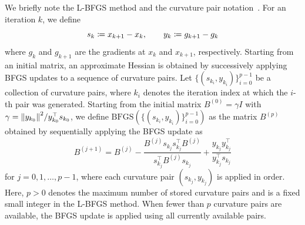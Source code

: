 \documentclass[journal]{subfiles}
\begin{document}
We briefly note the L-BFGS method and the curvature pair notation~\citep{nocedal1999numerical,liuLimitedMemoryBFGS1989a,berahasLimitedmemoryBFGSDisplacement2022}.
For an iteration $k$, we define
\begin{equation*}
    s_k \coloneqq x_{k+1}-x_k,\qquad
    y_k \coloneqq g_{k+1}-g_k
\end{equation*}
where $g_k$ and $g_{k+1}$ are the gradients at $x_k$ and $x_{k+1}$, respectively.
Starting from an initial matrix, an approximate Hessian is obtained by successively applying BFGS updates to a sequence of curvature pairs.
Let $\{(s_{k_i},y_{k_i})\}_{i=0}^{p-1}$ be a collection of curvature pairs, where $k_i$ denotes the iteration index at which the $i$-th pair was generated.
Starting from the initial matrix $B^{(0)} = \gamma I$ with $\gamma=\norm{y_{k_0}}^2 / y_{k_0}^\top s_{k_0}$, we define $\mathrm{BFGS}(\{(s_{k_i},y_{k_i})\}_{i=0}^{p-1})$ as the matrix $B^{(p)}$ obtained by sequentially applying the BFGS update as
\begin{equation*}
    B^{(j+1)} = B^{(j)} - \frac{B^{(j)} s_{k_j} s_{k_j}^\top B^{(j)}}{s_{k_j}^\top B^{(j)} s_{k_j}} + \frac{y_{k_j} y_{k_j}^\top}{y_{k_j}^\top s_{k_j}}
\end{equation*}
for $j=0,1,\ldots,p-1$, where each curvature pair $(s_{k_j},y_{k_j})$ is applied in order.
Here, $p>0$ denotes the maximum number of stored curvature pairs and is a fixed small integer in the L-BFGS method.
When fewer than $p$ curvature pairs are available, the BFGS update is applied using all currently available pairs.
\end{document}
